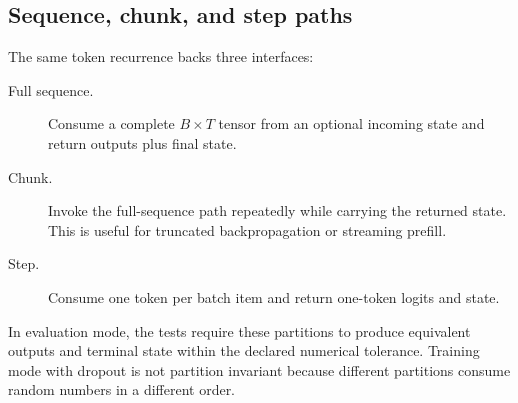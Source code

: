 \subsection{Sequence, chunk, and step paths}

The same token recurrence backs three interfaces:

\begin{description}
  \item[Full sequence.] Consume a complete \(B\times T\) tensor from an
  optional incoming state and return outputs plus final state.
  \item[Chunk.] Invoke the full-sequence path repeatedly while carrying the
  returned state. This is useful for truncated backpropagation or streaming
  prefill.
  \item[Step.] Consume one token per batch item and return one-token logits and
  state.
\end{description}

In evaluation mode, the tests require these partitions to produce equivalent
outputs and terminal state within the declared numerical tolerance. Training
mode with dropout is not partition invariant because different partitions
consume random numbers in a different order.
